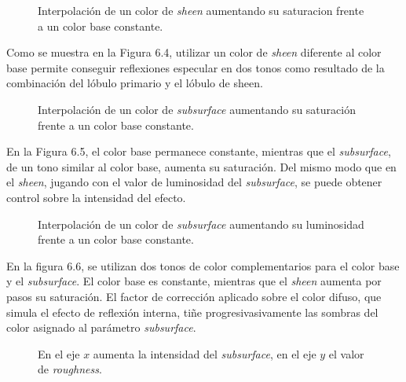 \begin{figure}[H]
  \vspace{0.5cm}
  \centering
  \caption{Interpolaci\'on de un color de \textit{sheen} aumentando su saturacion frente a un color base constante.}
\end{figure}
\singlespacing

Como se muestra en la Figura 6.4, utilizar un color de \textit{sheen} diferente al color base permite conseguir reflexiones especular en dos tonos como
resultado de la combinaci\'on del l\'obulo primario y el l\'obulo de sheen.

\begin{figure}[H]
  \vspace{0.5cm}
  \centering
    \caption{Interpolaci\'on de un color de \textit{subsurface} aumentando su saturaci\'on frente a un color base constante.}
\end{figure}
\singlespacing

En la Figura 6.5, el color base permanece constante, mientras que el \textit{subsurface}, de un tono similar al color base,
aumenta su saturaci\'on. Del mismo modo que en el \textit{sheen}, jugando con el valor de luminosidad del \textit{subsurface},
se puede obtener control sobre la intensidad del efecto.


\begin{figure}[H]
  \vspace{0.5cm}
  \centering
    \caption{Interpolaci\'on de un color de \textit{subsurface} aumentando su luminosidad frente a un color base constante.}
 \end{figure}
\singlespacing

En la figura 6.6, se utilizan dos tonos de color complementarios para el color base y el \textit{subsurface}. El color
base es constante, mientras que el \textit{sheen} aumenta por pasos su saturaci\'on.
El factor de correcci\'on aplicado sobre el color difuso, que simula el efecto de reflexi\'on interna, ti\~ne progresivasivamente
las sombras del color asignado al par\'ametro \textit{subsurface}.

\begin{figure}[H]
  \vspace{0.5cm}
  \centering
  \caption{En el eje $x$ aumenta la intensidad del \textit{subsurface}, en el eje $y$ el valor de \textit{roughness}.}
  \vspace{0.5cm}
\end{figure}
\singlespacing

